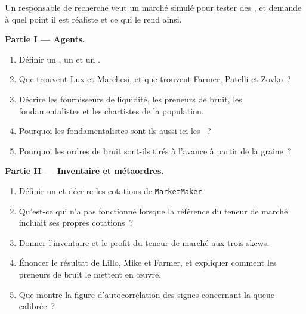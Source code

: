 \begin{problem}\label{pb:mx:build-an-agent-based-market:1}
Un responsable de recherche veut un marché simulé pour tester des , et demande à quel point il est réaliste et ce qui le rend ainsi.

\medskip\noindent\textbf{Partie I --- Agents.}
\begin{enumerate}
\item Définir un , un  et un .
\item Que trouvent Lux et Marchesi, et que trouvent Farmer, Patelli et Zovko~?
\item Décrire les fournisseurs de liquidité, les preneurs de bruit, les fondamentalistes et les chartistes de la population.
\item Pourquoi les fondamentalistes sont-ils aussi ici les ~?
\item Pourquoi les ordres de bruit sont-ils tirés à l'avance à partir de la graine~?
\end{enumerate}

\medskip\noindent\textbf{Partie II --- Inventaire et métaordres.}
\begin{enumerate}[resume]
\item Définir un  et décrire les cotations de \texttt{MarketMaker}.
\item Qu'est-ce qui n'a pas fonctionné lorsque la référence du teneur de marché incluait ses propres cotations~?
\item Donner l'inventaire et le profit du teneur de marché aux trois skews.
\item Énoncer le résultat de Lillo, Mike et Farmer, et expliquer comment les preneurs de bruit le mettent en œuvre.
\item Que montre la figure d'autocorrélation des signes concernant la queue calibrée~?
\end{enumerate}


\end{problem}
